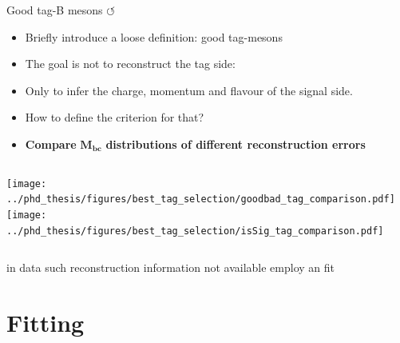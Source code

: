 \documentclass[xcolor=dvipsnames]{beamer}
\begin{document}
   \begin{frame}{Good tag-B mesons \hyperlink{frame:A}{$\circlearrowleft$}}
      \centering\scriptsize
      \begin{itemize}
         \item Briefly introduce a loose definition: good tag-\B mesons
         \item The goal is not to reconstruct the tag side:
         \item Only to infer the charge, momentum and flavour of the signal side.
         \item How to define the criterion for that?
         \item[\ra] \textbf{Compare} $\bm{M_{bc}}$ \textbf{distributions of different reconstruction errors}
      \end{itemize}
   
      \begin{columns}
         \centering
         \texttt{[image: ../phd\_thesis/figures/best\_tag\_selection/goodbad\_tag\_comparison.pdf]}
         \centering
         \texttt{[image: ../phd\_thesis/figures/best\_tag\_selection/isSig\_tag\_comparison.pdf]}
      \end{columns}
   
      \ra in data such reconstruction information not available
      \ra employ an \Mbc fit
   
   \end{frame}
   
\section{Fitting}
\end{document}
